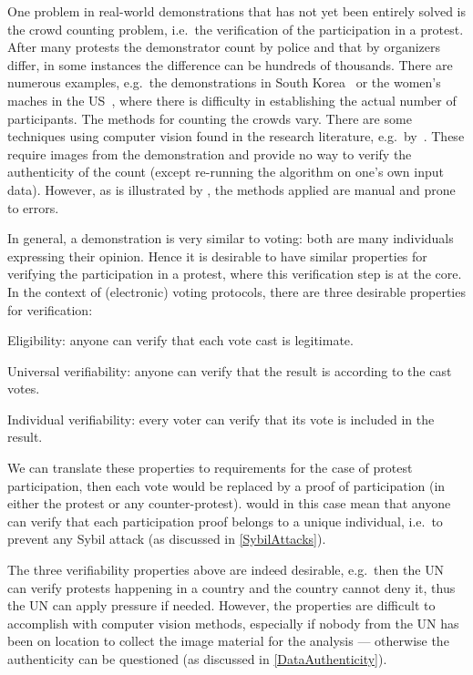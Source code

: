 One problem in real-world demonstrations that has not yet been entirely solved 
is the crowd counting problem, i.e.\ the verification of the participation in 
a protest.
After many protests the demonstrator count by police and that by organizers 
differ, in some instances the difference can be hundreds of thousands.
There are numerous examples, e.g.\ the demonstrations in South 
Korea~\cite{2016DemonstrationsInSeoul} or the women's maches in the 
US~\cite{2017WomensMarchesInUS}, where there is difficulty in establishing the 
actual number of participants.
The methods for counting the crowds vary.
There are some techniques using computer vision found in the research 
literature, e.g.\ by~\textcite{CVCrowdCounting}.
These require images from the demonstration and provide no way to verify the 
authenticity of the count (except re-running the algorithm on one's own input 
data).
However, as is illustrated by 
\textcite{2016DemonstrationsInSeoul,2017WomensMarchesInUS}, the methods applied
are manual and prone to errors.

In general, a demonstration is very similar to voting: both are many 
individuals expressing their opinion.
Hence it is desirable to have similar properties for verifying the 
participation in a protest, where this verification step is at the core.
In the context of (electronic) voting protocols, there are three desirable 
properties for verification:
\begin{requirements}[V]
\item\label{EligibilityVerif} Eligibility: anyone can verify that each vote 
  cast is legitimate.
\item\label{UniversalVerif} Universal verifiability: anyone can verify that the 
  result is according to the cast votes.
\item\label{IndividualVerif} Individual verifiability: every voter can verify 
  that its vote is included in the result.
\end{requirements}
We can translate these properties to requirements for the case of protest 
participation, then each vote would be replaced by a proof of participation (in 
either the protest or any counter-protest).
 would in this case mean that anyone can verify that 
each participation proof belongs to a unique individual, i.e.\ to prevent any 
Sybil attack (as discussed in \cref{SybilAttacks}).

The three verifiability properties above are indeed desirable, e.g.\ then the 
\ac{UN} can verify protests happening in a country and the country cannot deny 
it, thus the \ac{UN} can apply pressure if needed.
However, the properties are difficult to accomplish with computer vision 
methods, especially if nobody from the \ac{UN} has been on location to collect 
the image material for the analysis --- otherwise the authenticity can be 
questioned (as discussed in \cref{DataAuthenticity}).

